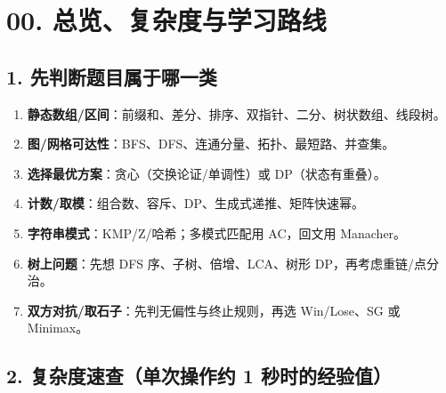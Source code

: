 \chapter{00. 总览、复杂度与学习路线}\label{ux603bux89c8ux590dux6742ux5ea6ux4e0eux5b66ux4e60ux8defux7ebf}

\section{1. 先判断题目属于哪一类}\label{ux5148ux5224ux65adux9898ux76eeux5c5eux4e8eux54eaux4e00ux7c7b}

\begin{enumerate}
\def\labelenumi{\arabic{enumi}.}
\tightlist
\item
  \textbf{静态数组/区间}：前缀和、差分、排序、双指针、二分、树状数组、线段树。
\item
  \textbf{图/网格可达性}：BFS、DFS、连通分量、拓扑、最短路、并查集。
\item
  \textbf{选择最优方案}：贪心（交换论证/单调性）或 DP（状态有重叠）。
\item
  \textbf{计数/取模}：组合数、容斥、DP、生成式递推、矩阵快速幂。
\item
  \textbf{字符串模式}：KMP/Z/哈希；多模式匹配用 AC，回文用 Manacher。
\item
  \textbf{树上问题}：先想 DFS 序、子树、倍增、LCA、树形 DP，再考虑重链/点分治。
\item
  \textbf{双方对抗/取石子}：先判无偏性与终止规则，再选 Win/Lose、SG 或 Minimax。
\end{enumerate}

\section{2. 复杂度速查（单次操作约 1 秒时的经验值）}\label{ux590dux6742ux5ea6ux901fux67e5ux5355ux6b21ux64cdux4f5cux7ea6-1-ux79d2ux65f6ux7684ux7ecfux9a8cux503c}

